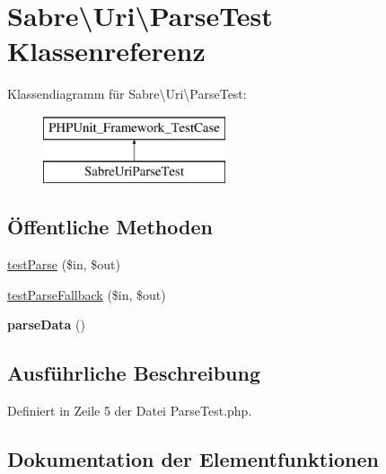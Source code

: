 \hypertarget{class_sabre_1_1_uri_1_1_parse_test}{}\section{Sabre\textbackslash{}Uri\textbackslash{}Parse\+Test Klassenreferenz}
\label{class_sabre_1_1_uri_1_1_parse_test}
Klassendiagramm für Sabre\textbackslash{}Uri\textbackslash{}Parse\+Test\+:\begin{figure}[H]
\begin{center}
\leavevmode
\includegraphics[height=2.000000cm]{class_sabre_1_1_uri_1_1_parse_test}
\end{center}
\end{figure}
\subsection*{Öffentliche Methoden}
\begin{DoxyCompactItemize}
\item 
\mbox{\hyperlink{class_sabre_1_1_uri_1_1_parse_test_a92d4fe5c64838ed785ebf7fd2cbf0294}{test\+Parse}} (\$in, \$out)
\item 
\mbox{\hyperlink{class_sabre_1_1_uri_1_1_parse_test_ae0a2cfed8c215667c7eea45f1c8e5de1}{test\+Parse\+Fallback}} (\$in, \$out)
\item 
\mbox{\label{class_sabre_1_1_uri_1_1_parse_test_ab2b44fe44ca6249457b4b269243a35ba}} 
{\bfseries parse\+Data} ()
\end{DoxyCompactItemize}


\subsection{Ausführliche Beschreibung}


Definiert in Zeile 5 der Datei Parse\+Test.\+php.



\subsection{Dokumentation der Elementfunktionen}
\mbox{\label{class_sabre_1_1_uri_1_1_parse_test_a92d4fe5c64838ed785ebf7fd2cbf0294}} 
